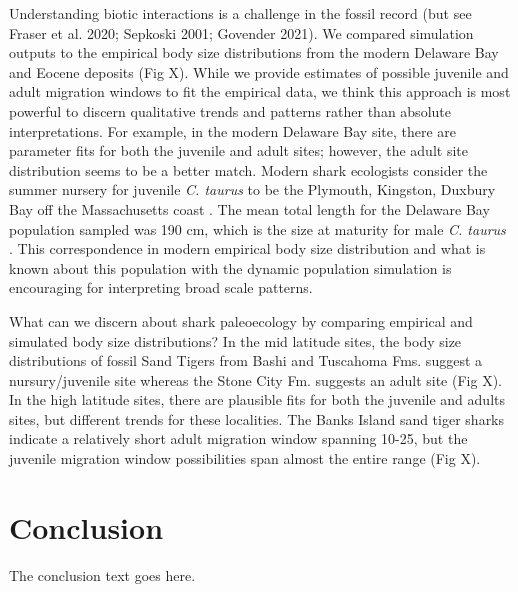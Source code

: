 \documentclass[]{rsos}%
\begin{document}
 Understanding biotic interactions is a challenge in the fossil record (but see Fraser et al. 2020; Sepkoski 2001; Govender 2021). 
 We compared simulation outputs to the empirical body size distributions from the modern Delaware Bay and Eocene deposits (Fig X).
 While we provide estimates of possible juvenile and adult migration windows to fit the empirical data, we think this approach is most powerful to discern qualitative trends and patterns rather than absolute interpretations.
For example, in the modern Delaware Bay site, there are parameter fits for both the juvenile and adult sites; however, the adult site distribution seems to be a better match.
Modern shark ecologists consider the summer nursery for juvenile \emph{C. taurus} to be the Plymouth, Kingston, Duxbury Bay off the Massachusetts coast \cite{kneebone2014movement}.
The mean total length for the Delaware Bay population sampled was 190 cm, which is the size at maturity for male \emph{C. taurus} \cite{gilmore1983reproduction}.
This correspondence in modern empirical body size distribution and what is known about this population with the dynamic population simulation is encouraging for interpreting broad scale patterns.

What can we discern about shark paleoecology by comparing empirical and simulated body size distributions?
In the mid latitude sites, the body size distributions of fossil Sand Tigers from Bashi and Tuscahoma Fms. suggest a nursury/juvenile site whereas the Stone City Fm. suggests an adult site (Fig X).
In the high latitude sites, there are plausible fits for both the juvenile and adults sites, but different trends for these localities.
The Banks Island sand tiger sharks indicate a relatively short adult migration window spanning 10-25, but the juvenile migration window possibilities span almost the entire range (Fig X).


\section{Conclusion}
The conclusion text goes here.

\vskip1pc



\end{document}
